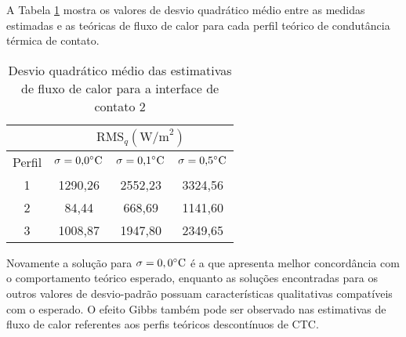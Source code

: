 A Tabela \ref{tabela_rms_fluxo_calor_interface_2} mostra os valores de desvio quadrático médio entre as medidas estimadas e as teóricas de fluxo de calor para cada perfil teórico de condutância térmica de contato.
\begin{table}[H]
	\centering
	\caption{Desvio quadrático médio das estimativas de fluxo de calor para a interface de contato 2}
	\begin{tabular}{c|c|c|c|}
		\cline{2-4}
		& \multicolumn{3}{c|}{$\text{RMS}_{q}(\text{W/m}^2)$} \\ \hline
		\multicolumn{1}{|c|}{Perfil} & $\sigma = \text{0,0}\celsius$   & $\sigma = \text{0,1}\celsius$    & $\sigma = \text{0,5}\celsius$  \\ \hline
		\multicolumn{1}{|c|}{1}      & 1290,26          &  2552,23      &  3324,56      \\ \hline
		\multicolumn{1}{|c|}{2}      & 84,44       & 668,69       & 1141,60      \\ \hline
		\multicolumn{1}{|c|}{3}      & 1008,87       & 1947,80       & 2349,65      \\ \hline
	\end{tabular}
	\label{tabela_rms_fluxo_calor_interface_2}
\end{table}

Novamente a solução para $\sigma = 0,0\celsius$ é a que apresenta melhor concordância com o comportamento teórico esperado, enquanto as soluções encontradas para os outros valores de desvio-padrão possuam características qualitativas compatíveis com o esperado. O efeito Gibbs também pode ser observado nas estimativas de fluxo de calor referentes aos perfis teóricos descontínuos de CTC.

%
%


